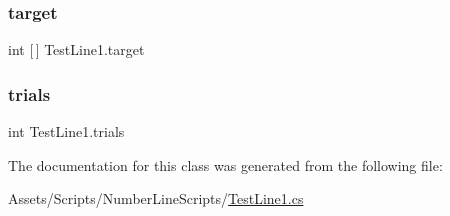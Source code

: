 \mbox{\label{classTestLine1_a7f5d0d4f0922b32d920f349ac3a28f0e}} 
\subsubsection{\texorpdfstring{target}{target}}
{\footnotesize\ttfamily int \mbox{[}$\,$\mbox{]} Test\+Line1.\+target}

\mbox{\label{classTestLine1_a533c8bc73c48db7b94b0a4b98ac2e307}} 
\subsubsection{\texorpdfstring{trials}{trials}}
{\footnotesize\ttfamily int Test\+Line1.\+trials}



The documentation for this class was generated from the following file\+:\begin{DoxyCompactItemize}
\item 
Assets/\+Scripts/\+Number\+Line\+Scripts/\hyperlink{TestLine1_8cs}{Test\+Line1.\+cs}\end{DoxyCompactItemize}
